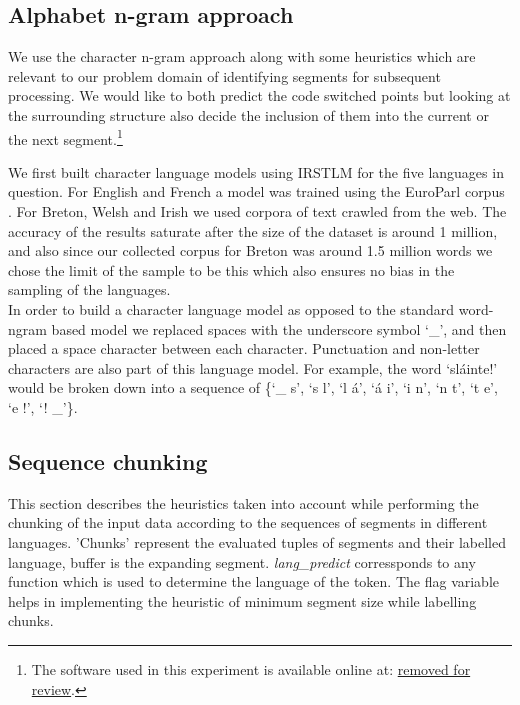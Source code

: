 \documentclass[11pt]{article}
\begin{document}
\subsection{Alphabet n-gram approach}
\label{alphan}

We use the character n-gram approach along with some heuristics which are relevant to our problem domain of identifying
segments for subsequent processing. We would like 
to both predict the code switched points but looking at the surrounding structure also decide the inclusion of them 
into the current or the next segment.\footnote{The software used in this experiment is available online at: \url{removed for review}.}

We first built character language models using IRSTLM \cite{federico08a} for the five languages in question. For English
and French a model was trained using the EuroParl corpus \cite{koehn2005europarl}. 
For Breton, Welsh and Irish we used corpora of text crawled from the web. 
The accuracy of the results saturate after the size of the dataset is around 1 million, and also since our collected corpus for Breton was around 1.5 million words we chose the limit of the sample to be this which also ensures no bias in the sampling of the languages. \\
In order to build a character language model as opposed to the standard word-ngram based model we replaced spaces with the underscore 
symbol `\_', and then placed a space character between each character. Punctuation and non-letter characters are also 
part of this language model. For example, the word `sl\'{a}inte!' would be broken down into a sequence 
of \{`\_ s', `s l', `l \'{a}', `\'{a} i', `i n', `n t', `t e', `e !', `! \_'\}. 


\subsection{Sequence chunking}
\label{cschunking}

This section describes the heuristics taken into account while performing the chunking of the input data according to 
the sequences of segments in different languages. 
'Chunks' represent the evaluated tuples of segments and their labelled language, buffer is the expanding segment.
 \textit{lang\_predict} corressponds to any function which is used to determine the language of the token. The flag 
variable helps in implementing the heuristic of minimum segment size while labelling chunks.
\end{document}
